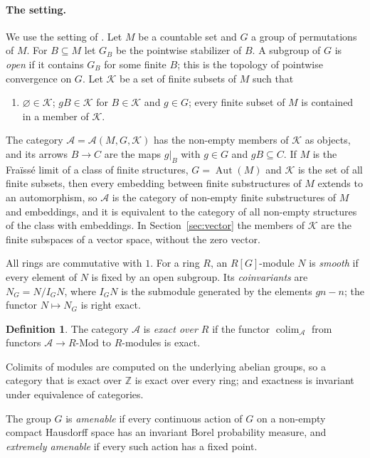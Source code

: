 \documentclass[11pt,a4paper]{article}
\theoremstyle{definition}
\newtheorem{definition}[theorem]{Definition}
\newcommand{\A}{\mathcal{A}}
\newcommand{\K}{\mathcal{K}}
\newcommand{\Z}{\mathbb{Z}}
\newcommand{\colim}{\operatorname{colim}}
\newcommand{\Aut}{\operatorname{Aut}}
\begin{document}
\paragraph{The setting.} We use the setting of \cite[\S3.1]{D1}. Let $M$ be a
countable set and $G$ a group of permutations of $M$. For $B\subseteq M$ let
$G_B$ be the pointwise stabilizer of $B$. A subgroup of $G$ is \emph{open} if
it contains $G_B$ for some finite $B$; this is the topology of pointwise
convergence on $G$. Let $\K$ be a set of finite subsets of $M$ such that
\begin{enumerate}
\item[\textup{(K1)}] $\varnothing\in\K$; $gB\in\K$ for $B\in\K$ and $g\in G$;
every finite subset of $M$ is contained in a member of $\K$.
\end{enumerate}
The category $\A=\A(M,G,\K)$ has the non-empty members of $\K$ as objects,
and its arrows $B\to C$ are the maps $g|_B$ with $g\in G$ and $gB\subseteq C$.
If $M$ is the Fra\"iss\'e limit of a class of finite structures, $G=\Aut(M)$
and $\K$ is the set of all finite subsets, then every embedding between
finite substructures of $M$ extends to an automorphism, so $\A$ is the
category of non-empty finite substructures of $M$ and embeddings, and it is
equivalent to the category of all non-empty structures of the class with
embeddings. In Section~\ref{sec:vector} the members of $\K$ are the finite
subspaces of a vector space, without the zero vector.

All rings are commutative with $1$. For a ring $R$, an $R[G]$-module $N$ is
\emph{smooth} if every element of $N$ is fixed by an open subgroup. Its
\emph{coinvariants} are $N_G=N/I_GN$, where $I_GN$ is the submodule generated
by the elements $gn-n$; the functor $N\mapsto N_G$ is right exact.

\begin{definition}\label{def:exact}
The category $\A$ is \emph{exact over $R$} if the functor
$\colim_{\A}$ from functors $\A\to R\text{-Mod}$ to $R$-modules is exact.
\end{definition}

Colimits of modules are computed on the underlying abelian groups, so a
category that is exact over $\Z$ is exact over every ring; and exactness is
invariant under equivalence of categories.

The group $G$ is \emph{amenable} if every continuous action of $G$ on a
non-empty compact Hausdorff space has an invariant Borel probability
measure, and \emph{extremely amenable} if every such action has a fixed
point.
\end{document}
